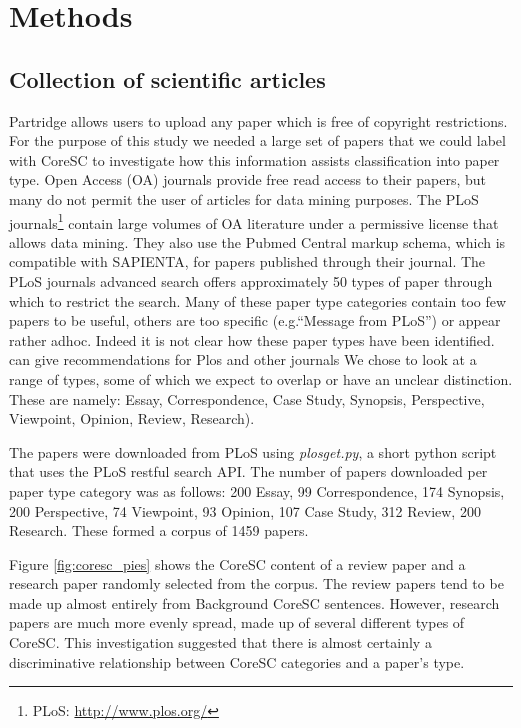 \documentclass{svmult}
\begin{document}
\section{Methods}
\label{sec:2}


\subsection*{Collection of scientific articles} Partridge allows users to
upload any paper which is free of copyright restrictions.  For the purpose of
this study we needed a large set of papers that we could label with CoreSC to
investigate how this information assists classification into paper type.  Open
Access (OA) journals provide free read access to their papers, but many do not
permit the user of articles for data mining purposes.  The PLoS
journals\footnote{PLoS: \url{http://www.plos.org/}} contain large volumes of OA
literature under a permissive license that allows data mining.  They also use
the Pubmed Central markup schema, which is compatible with SAPIENTA, for papers
published through their journal.  The PLoS journals advanced search offers
approximately 50 types of paper through which to restrict the search.  Many of
these paper type categories contain too few papers to be useful, others are too
specific (e.g.``Message from PLoS'') or appear rather adhoc.  Indeed it is not
clear how these paper types have been identified. %
can give recommendations for Plos and other journals We chose to look at a
range of types, some of which we expect to overlap or have an unclear
distinction.  These are namely: Essay, Correspondence, Case Study, Synopsis,
Perspective, Viewpoint, Opinion, Review, Research). 

The papers were downloaded from PLoS using {\em plosget.py}, a short python
script that uses the PLoS restful search API. The number of papers downloaded
per paper type category was as follows: 200 Essay, 99 Correspondence, 174
Synopsis, 200 Perspective, 74 Viewpoint, 93 Opinion, 107 Case Study, 312
Review, 200 Research.  These formed a corpus of 1459 papers.

Figure \ref{fig:coresc_pies} shows the CoreSC content of a review paper and a
research paper randomly selected from the corpus.  The review papers tend to be
made up almost entirely from Background CoreSC sentences.  However, research
papers are much more evenly spread, made up of several different types of
CoreSC.  This investigation suggested that there is almost certainly a
discriminative relationship between CoreSC categories and a paper's type. 
\end{document}
